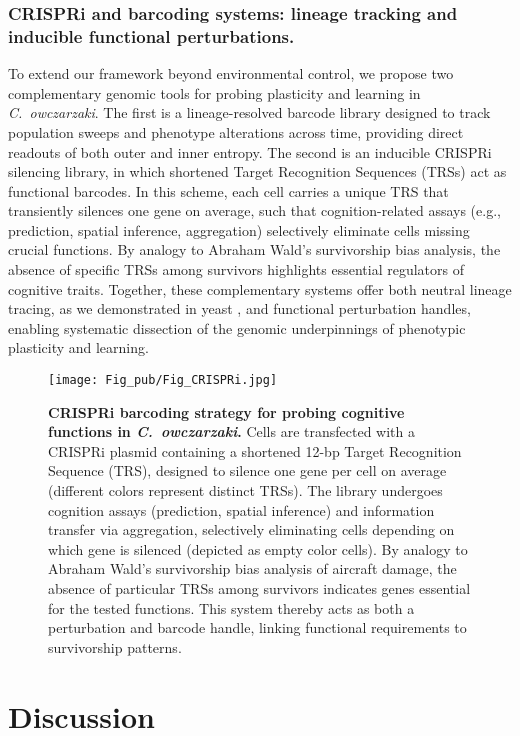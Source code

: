 \documentclass[aps,pre,twocolumn,floatfix,nofootinbib,amsmath,amssymb]{revtex4-2}
\begin{document}
\subsubsection{CRISPRi and barcoding systems: lineage tracking and inducible functional perturbations.}
To extend our framework beyond environmental control, we propose two complementary genomic tools for probing plasticity and learning in \textit{C.\ owczarzaki}. The first is a lineage-resolved barcode library designed to track population sweeps and phenotype alterations across time, providing direct readouts of both outer and inner entropy. The second is an inducible CRISPRi silencing library, in which shortened Target Recognition Sequences (TRSs) act as functional barcodes. In this scheme, each cell carries a unique TRS that transiently silences one gene on average, such that cognition-related assays (e.g., prediction, spatial inference, aggregation) selectively eliminate cells missing crucial functions. By analogy to Abraham Wald's survivorship bias analysis, the absence of specific TRSs among survivors highlights essential regulators of cognitive traits. Together, these complementary systems offer both neutral lineage tracing, as we demonstrated in yeast \citep{rezenman_gumi-bear_2023}, and functional perturbation handles, enabling systematic dissection of the genomic underpinnings of phenotypic plasticity and learning.

\begin{figure*}[t]
\centering
\texttt{[image: Fig\_pub/Fig\_CRISPRi.jpg]}
\caption{\textbf{CRISPRi barcoding strategy for probing cognitive functions in \textit{C.\ owczarzaki}.}
Cells are transfected with a CRISPRi plasmid containing a shortened 12-bp Target Recognition Sequence (TRS), designed to silence one gene per cell on average (different colors represent distinct TRSs). The library undergoes cognition assays (prediction, spatial inference) and information transfer via aggregation, selectively eliminating cells depending on which gene is silenced (depicted as empty color cells). By analogy to Abraham Wald's survivorship bias analysis \citep{mangel_abraham_1984} of aircraft damage, the absence of particular TRSs among survivors indicates genes essential for the tested functions. This system thereby acts as both a perturbation and barcode handle, linking functional requirements to survivorship patterns.}
\label{Fig_CRISPRi}
\end{figure*}

\section{Discussion}
\end{document}
